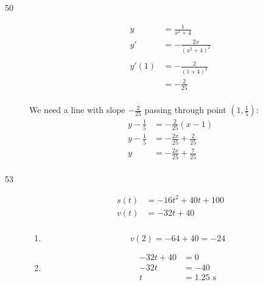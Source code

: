 \documentclass{exam}
\begin{document}
\begin{description}
\item[50]
\begin{align*}
  y  &= \frac{1}{x^2 + 4} \\
  y' &= - \frac{2x}{(x^2 + 4)^2} \\
  \\
  y'(1) &= -\frac{2}{(1 + 4)^2} \\
     &= -\frac{2}{25} \\
\end{align*}

We need a line with slope $- \frac{2}{25}$ passing through point $\left(1, \frac{1}{5} \right)$:
\begin{align*}
  y - \frac{1}{5} &= - \frac{2}{25} (x - 1) \\
  y - \frac{1}{5} &= - \frac{2x}{25} + \frac{2}{25} \\
  y &= - \frac{2x}{25} + \frac{7}{25} \\
\end{align*}

\item[53]
\begin{align*}
  s(t) &= -16t^2 + 40t + 100 \\
  v(t) &= -32t + 40 \\
\end{align*}

\begin{enumerate}[a]
\item
\[
  v(2) = -64 + 40 = -24
\]

\item
\begin{align*}
  -32t + 40 &= 0 \\
  -32t      &= -40 \\
  t         &= 1.25 \text{ s} \\
\end{align*}

\end{enumerate}
\end{description}

\else

\vspace{10 cm}


\end{document}
